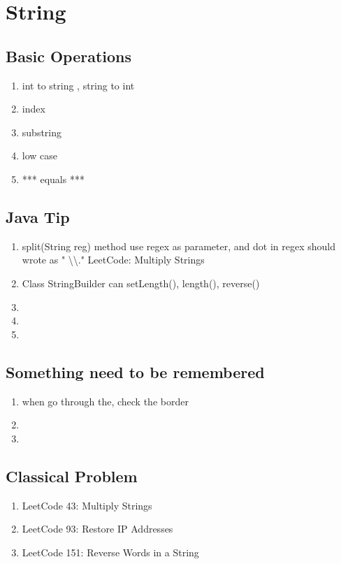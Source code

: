 \chapter{ String }

\section{ Basic Operations  }



\begin{enumerate}
    \item int to string , string to int
    \item index
    \item substring
    \item low case
    \item *** equals ***



\end{enumerate}

\section{ Java Tip }

 \begin{enumerate}
    \item split(String reg) method use regex as parameter, and dot in regex should wrote as " \textbackslash \textbackslash ." LeetCode: Multiply Strings

    \item Class StringBuilder can setLength(), length(), reverse()

    \item

    \item

    \item

\end{enumerate}

\section{ Something need to be remembered }

\begin{enumerate}
    \item  when go through the, check the border 
    \item  
    \item  

\end{enumerate}


\section{ Classical Problem }

\begin{enumerate}
    \item LeetCode 43: Multiply Strings
    \item LeetCode 93: Restore IP Addresses
    \item LeetCode 151: Reverse Words in a String

\end{enumerate}
